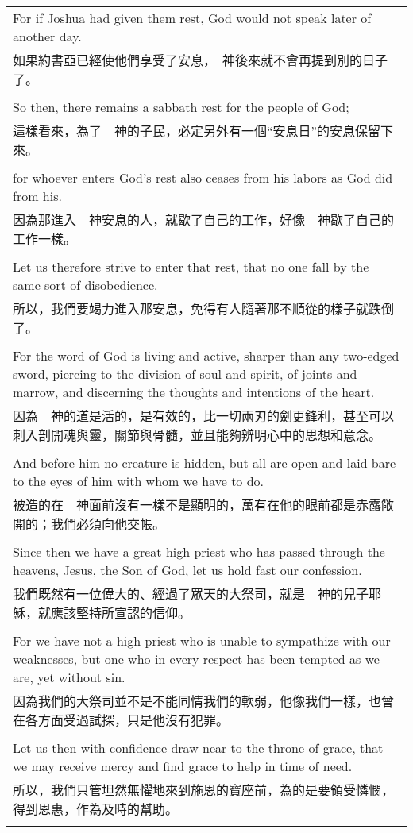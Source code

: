 \documentclass{book}
\begin{document}
\begin{tabularx}{\textwidth}{p{}}
For if Joshua had given them rest, God would not speak later of another day. \\
如果約書亞已經使他們享受了安息，　神後來就不會再提到別的日子了。 \\ \\
So then, there remains a sabbath rest for the people of God; \\
這樣看來，為了　神的子民，必定另外有一個“安息日”的安息保留下來。 \\ \\
for whoever enters God's rest also ceases from his labors as God did from his. \\
因為那進入　神安息的人，就歇了自己的工作，好像　神歇了自己的工作一樣。 \\ \\
Let us therefore strive to enter that rest, that no one fall by the same sort of disobedience. \\
所以，我們要竭力進入那安息，免得有人隨著那不順從的樣子就跌倒了。 \\ \\
For the word of God is living and active, sharper than any two-edged sword, piercing to the division of soul and spirit, of joints and marrow, and discerning the thoughts and intentions of the heart. \\
因為　神的道是活的，是有效的，比一切兩刃的劍更鋒利，甚至可以刺入剖開魂與靈，關節與骨髓，並且能夠辨明心中的思想和意念。 \\ \\
And before him no creature is hidden, but all are open and laid bare to the eyes of him with whom we have to do. \\
被造的在　神面前沒有一樣不是顯明的，萬有在他的眼前都是赤露敞開的；我們必須向他交帳。 \\ \\
Since then we have a great high priest who has passed through the heavens, Jesus, the Son of God, let us hold fast our confession. \\
我們既然有一位偉大的、經過了眾天的大祭司，就是　神的兒子耶穌，就應該堅持所宣認的信仰。 \\ \\
For we have not a high priest who is unable to sympathize with our weaknesses, but one who in every respect has been tempted as we are, yet without sin. \\
因為我們的大祭司並不是不能同情我們的軟弱，他像我們一樣，也曾在各方面受過試探，只是他沒有犯罪。 \\ \\
Let us then with confidence draw near to the throne of grace, that we may receive mercy and find grace to help in time of need. \\
所以，我們只管坦然無懼地來到施恩的寶座前，為的是要領受憐憫，得到恩惠，作為及時的幫助。 \\ \\

\hline
\end{tabularx}
\end{document}
